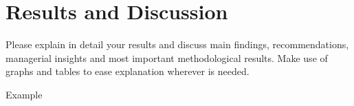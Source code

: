 \section{Results and Discussion}
    Please explain in detail your results and discuss main findings, recommendations, managerial insights and most important methodological results. Make use of graphs and tables to ease explanation wherever is needed. 
    
    Example \citep{2020supply}